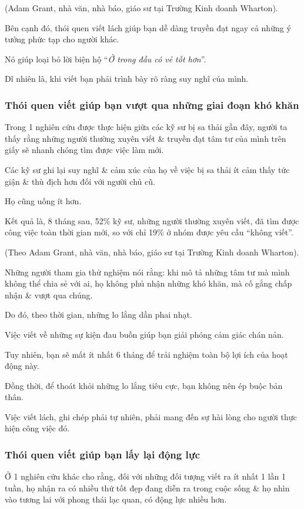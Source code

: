 \documentclass{article}
\begin{document}
(Adam Grant, nhà văn, nhà báo, giáo sư tại Trường Kinh doanh Wharton).

%
Bên cạnh đó, thói quen viết lách giúp bạn dễ dàng truyền đạt ngay cả những ý tưởng phức tạp cho người khác.

Nó giúp loại bỏ lời biện hộ ``\textit{Ở trong đầu có vẻ tốt hơn}''.

Dĩ nhiên là, khi viết bạn phải trình bày rõ ràng suy nghĩ của mình.

\subsubsection{Thói quen viết giúp bạn vượt qua những giai đoạn khó khăn}
Trong 1 nghiên cứu được thực hiện giữa các kỹ sư bị sa thải gần đây, người ta thấy rằng những người thường xuyên viết \& truyền đạt tâm tư của mình trên giấy sẽ nhanh chóng tìm được việc làm mới.

%
Các kỹ sư ghi lại suy nghĩ \& cảm xúc của họ về việc bị sa thải ít cảm thấy tức giận \& thù địch hơn đối với người chủ cũ.

Họ cũng uống ít hơn.

Kết quả là, 8 tháng sau, 52\% kỹ sư, những người thường xuyên viết, đã tìm được công việc toàn thời gian mới, so với chỉ 19\% ở nhóm được yêu cầu ``không viết''.

(Theo Adam Grant, nhà văn, nhà báo, giáo sư tại Trường Kinh doanh Wharton).

%
Những người tham gia thử nghiệm nói rằng: khi mô tả những tâm tư mà mình  không thể chia sẻ với ai, họ không phủ nhận những khó khăn, mà cố gắng chấp nhận \& vượt qua chúng.

Do đó, theo thời gian, những lo lắng dần phai nhạt.

%
Việc viết về những sự kiện đau buồn giúp bạn giải phóng cảm giác chán nản.

Tuy nhiên, bạn sẽ mất ít nhất 6 tháng để trải nghiệm toàn bộ lợi ích của hoạt động này.

Đồng thời, để thoát khỏi những lo lắng tiêu cực, bạn không nên ép buộc bản thân.

Việc viết lách, ghi chép phải tự nhiên, phải mang đến sự hài lòng cho người thực hiện công việc đó.

\subsubsection{Thói quen viết giúp bạn lấy lại động lực}
Ở 1 nghiên cứu khác cho rằng, đối với những đối tượng viết ra ít nhất 1 lần 1 tuần, họ nhận ra có nhiều thứ tốt đẹp đang diễn ra trong cuộc sống \& họ nhìn vào tương lai với phong thái lạc quan, có động lực nhiều hơn.
\end{document}
